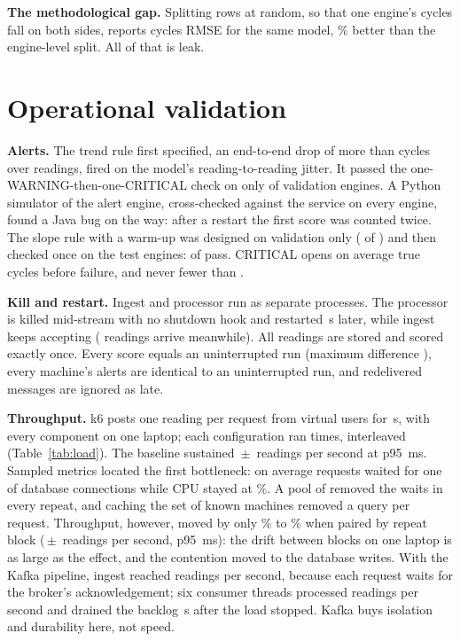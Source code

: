 \documentclass[conference]{IEEEtran}
\newcommand{\pmsd}[2]{#1\,$\pm$\,#2}
\begin{document}
\textbf{The methodological gap.} Splitting rows at random, so that one engine's cycles fall on both sides,
reports \RowsplitRmse{} cycles RMSE for the same model, \RowsplitOptimismPct{}\% better than the
engine-level split. All of that is leak.

\section{Operational validation}
\textbf{Alerts.} The trend rule first specified, an end-to-end drop of more than \OriginalTrendDrop{} cycles over
\OriginalTrendWindow{} readings,
fired on the model's reading-to-reading jitter. It passed the one-WARNING-then-one-CRITICAL check on only
\AlertOriginalPass{} of \SplitVal{} validation engines. A Python simulator of the alert engine, cross-checked against the
service on every engine, found a Java bug on the way: after a restart the first score was counted twice. The
slope rule with a warm-up was designed on validation only (\AlertChosenPass{} of \SplitVal{}) and then checked once on the
test engines: \AlertReplayTestEnginesPassing{} of \AlertReplayTestEngines{} pass. CRITICAL opens on average
\AlertReplayTestMeanTrueRulAtCritical{} true cycles before failure, and never fewer than
\AlertReplayTestMinTrueRulAtCritical{}.

\textbf{Kill and restart.} Ingest and processor run as separate processes. The processor is killed mid-stream
with no shutdown hook and restarted \RestartSecondsDown{}\,s later, while ingest keeps accepting
(\RestartReadingsWhileDown{} readings arrive meanwhile). All \RestartFileRows{} readings are stored and scored
exactly once. Every score equals an uninterrupted run (maximum difference \RestartMaxDiff{}), every machine's
alerts are identical to an uninterrupted run, and \RestartRedeliveredAndIgnoredAsLate{} redelivered messages are
ignored as late.

\textbf{Throughput.} k6 posts one reading per request from \LtBeforeVus{} virtual users for \LtBeforeDurationS{}\,s, with every
component on one laptop; each configuration ran \LtBeforeRuns{} times, interleaved (Table~\ref{tab:load}). The baseline
sustained \pmsd{\LtBeforeRps}{\LtBeforeRpsStd} readings per second at p95 \LtBeforePNineFive{}\,ms. Sampled metrics located
the first bottleneck: on average \LtBeforePoolPending{} requests waited for one of \LtBeforePool{} database connections while
CPU stayed at \LtBeforeCpuPct{}\%. A pool of \LtAfterPool{} removed the waits in every repeat, and caching the set of
known machines removed a query per request. Throughput, however, moved by only \LtTotalGainMin{}\% to
\LtTotalGainMax{}\% when paired by repeat block (\pmsd{\LtAfterCacheRps}{\LtAfterCacheRpsStd} readings per second, p95
\LtAfterCachePNineFive{}\,ms): the drift between blocks on one laptop is as large as the effect, and the contention moved
to the database writes. With the Kafka pipeline, ingest reached \LtKafkaRps{} readings per second, because each
request waits for the broker's acknowledgement; six consumer threads processed \LtKafkaProcessedRps{} readings per second and
drained the backlog \LtKafkaDrainS{}\,s after the load stopped. Kafka buys isolation and durability here, not speed.
\end{document}

